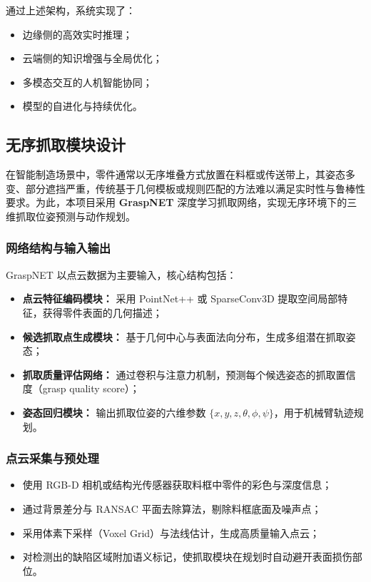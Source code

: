 \documentclass{cumcmthesis}
\begin{document}
通过上述架构，系统实现了：
\begin{itemize}
    \item 边缘侧的高效实时推理；
    \item 云端侧的知识增强与全局优化；
    \item 多模态交互的人机智能协同；
    \item 模型的自进化与持续优化。
\end{itemize}

\subsection{无序抓取模块设计}

在智能制造场景中，零件通常以无序堆叠方式放置在料框或传送带上，其姿态多变、部分遮挡严重，传统基于几何模板或规则匹配的方法难以满足实时性与鲁棒性要求。为此，本项目采用 \textbf{GraspNET} 深度学习抓取网络，实现无序环境下的三维抓取位姿预测与动作规划。

\subsubsection{网络结构与输入输出}

GraspNET 以点云数据为主要输入，核心结构包括：
\begin{itemize}
    \item \textbf{点云特征编码模块：} 采用 PointNet++ 或 SparseConv3D 提取空间局部特征，获得零件表面的几何描述；
    \item \textbf{候选抓取点生成模块：} 基于几何中心与表面法向分布，生成多组潜在抓取姿态；
    \item \textbf{抓取质量评估网络：} 通过卷积与注意力机制，预测每个候选姿态的抓取置信度（grasp quality score）；
    \item \textbf{姿态回归模块：} 输出抓取位姿的六维参数 $\{x, y, z, \theta, \phi, \psi\}$，用于机械臂轨迹规划。
\end{itemize}

\subsubsection{点云采集与预处理}

\begin{itemize}
    \item 使用 RGB-D 相机或结构光传感器获取料框中零件的彩色与深度信息；
    \item 通过背景差分与 RANSAC 平面去除算法，剔除料框底面及噪声点；
    \item 采用体素下采样（Voxel Grid）与法线估计，生成高质量输入点云；
    \item 对检测出的缺陷区域附加语义标记，使抓取模块在规划时自动避开表面损伤部位。
\end{itemize}
\end{document}
